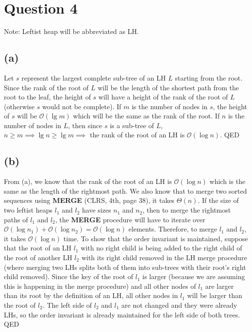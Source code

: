 \section{Question 4}
    Note: Leftist heap will be abbreviated as LH.
    \subsection{(a)}
    Let $s$ represent the largest complete sub-tree of an LH $L$ starting from the root. Since the rank of the root of $L$ will be the length of the shortest path from the root to the leaf, the height of $s$ will have a height of the rank of the root of $L$ (otherwise $s$ would not be complete). If $m$ is the number of nodes in $s$, the height of $s$ will be $\mathcal{O}(\lg{m})$ which will be the same as the rank of the root. If $n$ is the number of nodes in $L$, then since $s$ is a sub-tree of $L$, $n \geq m \implies \lg{n} \geq \lg{m} \implies$ the rank of the root of an LH is $\mathcal{O}(\log{n})$. QED
    
    \subsection{(b)}
    From (a), we know that the rank of the root of an LH is $\mathcal{O}(\log{n})$ which is the same as the length of the rightmost path. We also know that to merge two sorted sequences using \textbf{MERGE} (CLRS, 4th, page 38), it takes $\Theta(n)$. If the size of two leftist heaps $l_1$ and $l_2$ have sizes $n_1$ and $n_2$, then to merge the rightmost paths of $l_1$ and $l_2$, the \textbf{MERGE} procedure will have to iterate over $\mathcal{O}(\log{n_1}) + \mathcal{O}(\log{n_2}) = \mathcal{O}(\log{n})$ elements. Therefore, to merge $l_1$ and $l_2$, it takes $\mathcal{O}(\log{n})$ time. To show that the order invariant is maintained, suppose that the root of an LH $l_1$ with no right child is being added to the right child of the root of another LH $l_2$ with its right child removed in the LH merge procedure (where merging two LHs splits both of them into sub-trees with their root's right child removed). Since the key of the root of $l_1$ is larger (because we are assuming this is happening in the merge procedure) and all other nodes of $l_1$ are larger than its root by the definition of an LH, all other nodes in $l_1$ will be larger than the root of $l_2$. The left side of $l_2$ and $l_1$ are not changed and they were already  LHs, so the order invariant is already maintained for the left side of both trees.
    QED
    
